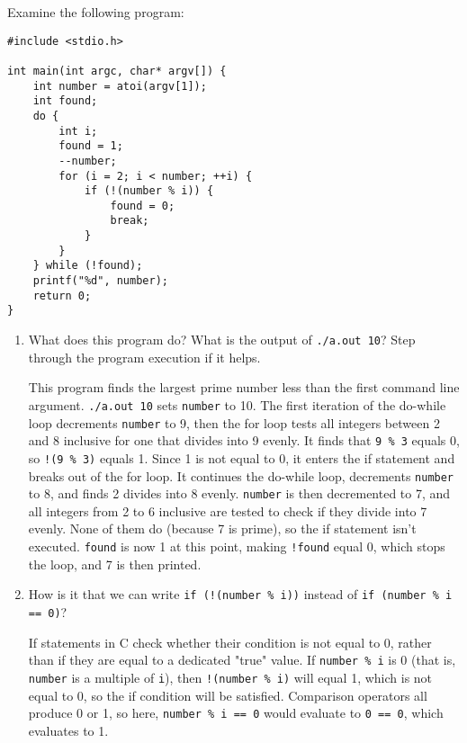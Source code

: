 Examine the following program:

\begin{verbatim}
#include <stdio.h>

int main(int argc, char* argv[]) {
    int number = atoi(argv[1]);
    int found;
    do {
        int i;
        found = 1;
        --number;
        for (i = 2; i < number; ++i) {
            if (!(number % i)) {
                found = 0;
                break;
            }
        }
    } while (!found);
    printf("%d", number);
    return 0;
}
\end{verbatim}

\begin{enumerate}

\item What does this program do? What is the output of \texttt{./a.out 10}? Step through the program execution if it helps.

\begin{answer}
This program finds the largest prime number less than the first command line argument. \texttt{./a.out 10} sets \texttt{number} to 10. The first iteration of the do-while loop decrements \texttt{number} to 9, then the for loop tests all integers between 2 and 8 inclusive for one that divides into 9 evenly. It finds that \texttt{9 \% 3} equals 0, so \texttt{!(9 \% 3)} equals 1. Since 1 is not equal to 0, it enters the if statement and breaks out of the for loop. It continues the do-while loop, decrements \texttt{number} to 8, and finds 2 divides into 8 evenly. \texttt{number} is then decremented to 7, and all integers from 2 to 6 inclusive are tested to check if they divide into 7 evenly. None of them do (because 7 is prime), so the if statement isn't executed. \texttt{found} is now 1 at this point, making \texttt{!found} equal 0, which stops the loop, and 7 is then printed.
\end{answer}



\item How is it that we can write \texttt{if (!(number \% i))} instead of \texttt{if (number \% i == 0)}?

\begin{answer}
If statements in C check whether their condition is not equal to 0, rather than if they are equal to a dedicated "true" value. If \texttt{number \% i} is 0 (that is, \texttt{number} is a multiple of \texttt{i}), then \texttt{!(number \% i)} will equal 1, which is not equal to 0, so the if condition will be satisfied. Comparison operators all produce 0 or 1, so here, \texttt{number \% i == 0} would evaluate to \texttt{0 == 0}, which evaluates to 1.
\end{answer}




\end{enumerate}

